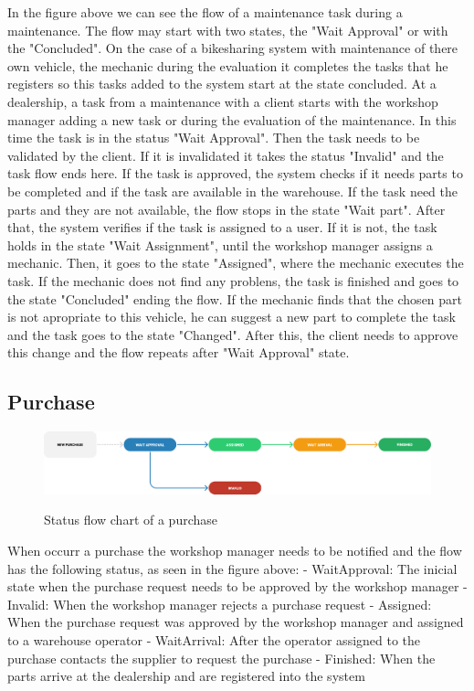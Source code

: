 In the figure above we can see the flow of a maintenance task during a maintenance.
The flow may start with two states, the "Wait Approval" or with the "Concluded".
On the case of a bikesharing system with maintenance of there own vehicle, the mechanic during the evaluation it completes the tasks that he registers so this tasks added to the system start at the state concluded.
At a dealership, a task from a maintenance with a client starts with the workshop manager adding a new task or during the evaluation of the maintenance.
In this time the task is in the status "Wait Approval". Then the task needs to be validated by the client. 
If it is invalidated it takes the status "Invalid" and the task flow ends here. If the task is approved, the system checks if it needs parts to be completed and if the task are available in the warehouse.
If the task need the parts and they are not available, the flow stops in the state "Wait part". After that, the system verifies if the task is assigned to a user. 
If it is not, the task holds in the state "Wait Assignment", until the workshop manager assigns a mechanic. Then, it goes to the state "Assigned", where the mechanic executes the task.
If the mechanic does not find any problens, the task is finished and goes to the state "Concluded" ending the flow. If the mechanic finds that the chosen part is not apropriate to this vehicle, he can suggest a new part to complete the task and the task goes to the state "Changed".
After this, the client needs to approve this change and the flow repeats after "Wait Approval" state.


\subsection{Purchase} 



\begin{figure}[h]
  \caption{Status flow chart of a purchase}
  \centering
  \includegraphics[width=\textwidth]{figs/Status/Purchase/StatusDiagram}
  \label{fig:figure2}
\end{figure}


When occurr a purchase the workshop manager needs to be notified and the flow has the following status, as seen in the figure above:
- WaitApproval: The inicial state when the purchase request needs to be approved by the workshop manager
- Invalid: When the workshop manager rejects a purchase request
- Assigned: When the purchase request was approved by the workshop manager and assigned to a warehouse operator
- WaitArrival: After the operator assigned to the purchase contacts the supplier to request the purchase
- Finished: When the parts arrive at the dealership and are registered into the system


